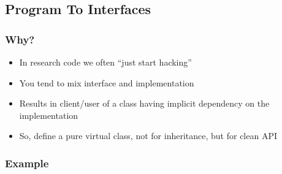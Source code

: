 \hypertarget{program-to-interfaces}{%
\subsection{Program To Interfaces}\label{program-to-interfaces}}

\hypertarget{why}{%
\subsubsection{Why?}\label{why}}

\begin{itemize}
\tightlist
\item
  In research code we often ``just start hacking''
\item
  You tend to mix interface and implementation
\item
  Results in client/user of a class having implicit dependency on the
  implementation
\item
  So, define a pure virtual class, not for inheritance, but for clean
  API
\end{itemize}

\hypertarget{example-1}{%
\subsubsection{Example}\label{example-1}}

